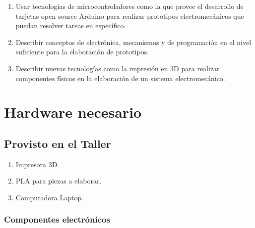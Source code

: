 \documentclass[]{article}
\begin{document}
\begin{enumerate}
    \item Usar tecnologías de microcontroladores como la que provee el desarrollo de tarjetas open source Arduino para realizar prototipos electromecánicos que puedan resolver tareas en específico.
    \item Describir conceptos de electrónica, mecanismos y de programación en el nivel suficiente para la elaboración de prototipos.
    \item Describir nuevas tecnologías como la impresión en 3D para realizar componentes físicos en la elaboración de un sistema electromecánico.
\end{enumerate}

\section{Hardware necesario}


\subsection{Provisto en el Taller}

\begin{enumerate}
	\item Impresora 3D.
	\item PLA para piezas a elaborar.
	\item Computadora Laptop.
\end{enumerate}



\subsubsection{Componentes electrónicos}
\end{document}
